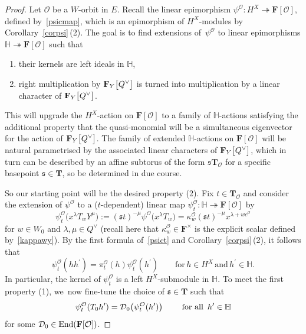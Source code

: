 \begin{proof}
Let $\mathcal{O}$ be a $W$-orbit in $E$.
Recall the linear epimorphism $\psi^\mathcal{O}\colon H^X\twoheadrightarrow\mathbf{F}[\mathcal{O}]$,
defined by~\eqref{psicmap}, which is an epimorphism of $H^X$-modules by Corollary~\ref{corpsi}\,(2). The goal is to find extensions of~$\psi^{\mathcal{O}}$ to linear epimorphisms $\mathbb{H}\twoheadrightarrow\mathbf{F}[\mathcal{O}]$ such that
\begin{enumerate}\itemsep=0pt
\item[(1)] their kernels are left ideals in $\mathbb{H}$,
\item[(2)]
right multiplication by $\mathbf{F}_Y\smash{\bigl[Q^\vee\bigr]}$ is turned into multiplication by a linear character of $\mathbf{F}_Y\smash{\bigl[Q^\vee\bigr]}$.
\end{enumerate}
This will upgrade the $H^X$-action on $\mathbf{F}[\mathcal{O}]$ to a family of $\mathbb{H}$-actions satisfying the additional property that the quasi-monomial  will be a simultaneous eigenvector
for the action of $\mathbf{F}_Y\smash{\bigl[Q^\vee\bigr]}$. The family of extended $\mathbb{H}$-actions on $\mathbf{F}[\mathcal{O}]$ will be natural parametrised by the associated linear characters of $\mathbf{F}_Y\smash{\bigl[Q^\vee\bigr]}$, which in turn can be described by an affine subtorus of the form $\mathfrak{s}\mathbf{T}_{\mathcal{O}}$ for a specific basepoint $\mathfrak{s}\in\mathbf{T}$, so be determined in due course.

So our starting point will be the desired property (2). Fix $t\in\mathbf{T}_{\mathcal{O}}$ and consider the extension of $\psi^\mathcal{O}$ to a ($t$-dependent) linear map $\psi_{t}^\mathcal{O}\colon \mathbb{H}\twoheadrightarrow\mathbf{F}[\mathcal{O}]$ by
\begin{equation}\label{psict}
\psi_{t}^\mathcal{O}\bigl(x^\lambda T_wY^\mu\bigr):=(\mathfrak{s}t)^{-\mu}\psi^\mathcal{O}\bigl(x^\lambda T_w\bigr)=\kappa_w^\mathcal{O}(\mathfrak{s}t)^{-\mu}x^{\lambda+wc^\mathcal{O}}
\end{equation}
for $w\in W_0$ and $\lambda,\mu\in Q^\vee$ \big(recall here that $\kappa_w^\mathcal{O}\in\mathbf{F}^\times$ is the explicit scalar defined by~\eqref{kappawy}\big).
By the first formula of~\eqref{psict} and Corollary~\ref{corpsi}\,(2), it follows that
\[
\psi_{t}^\mathcal{O}(hh^\prime)
=\pi_{t}^\mathcal{O}(h)\psi_{t}^\mathcal{O}(h^\prime)\qquad \text{for}\, h\in H^X\, \text{and}\, h^\prime\in\mathbb{H}.
\]
In particular, the kernel of $\psi_{t}^\mathcal{O}$ is a left $H^X$-submodule in $\mathbb{H}$.
To meet the first property (1), we~now fine-tune the choice of $\mathfrak{s}\in\mathbf{T}$ such that
\[
\psi_{t}^{\mathcal{O}}(T_0h^\prime)=\mathcal{D}_0\bigl(\psi_{t}^\mathcal{O}(h^\prime)\bigr) \qquad \textup{ for all }\, h^\prime\in\mathbb{H}
\]
for some $\mathcal{D}_0\in\textup{End}(\mathbf{F}[\mathcal{O}])$.


\end{proof}
